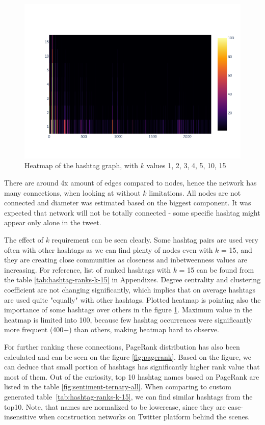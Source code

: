 \documentclass[conference]{IEEEtran}
\begin{document}
    \begin{figure}
        \includegraphics[scale=0.32]{figures/hashtag_heatmap_by_k}
        \caption{Heatmap of the hashtag graph, with $k$ values 1, 2, 3, 4, 5, 10, 15}
        \label{fig:hashtag-heatmap}
    \end{figure}

    There are around 4x amount of edges compared to nodes, hence the network has many connections, when looking at without $k$ limitations.
    All nodes are not connected and diameter was estimated based on the biggest component.
    It was expected that network will not be totally connected - some specific hashtag might appear only alone in the tweet.

    The effect of $k$ requirement can be seen clearly.
    Some hashtag pairs are used very often with other hashtags as we can find plenty of nodes even with $k$ = 15,
    and they are creating close communities as closeness and inbetweenness values are increasing.
    For reference, list of ranked hashtags with $k$ = 15 can be found from the table \ref{tab:hashtag-ranks-k-15} in Appendixes.
    Degree centrality and clustering coefficient are not changing significantly, which implies that on average hashtags are used quite "equally" with other hashtags.
    Plotted heatmap is pointing also the importance of some hashtags over others in the figure \ref{fig:hashtag-heatmap}.
    Maximum value in the heatmap is limited into 100, because few hashtag occurrences were significantly more frequent (400+) than others, making heatmap hard to observe.


    For further ranking these connections, PageRank distribution has also been calculated and can be seen on the figure \ref{fig:pagerank}.
    Based on the figure, we can deduce that small portion of hashtags has significantly higher rank value that most of them.
    Out of the curiosity, top 10 hashtag names based on PageRank are listed in the table \ref{fig:sentiment-ternary-all}.
    When comparing to custom generated table~\ref{tab:hashtag-ranks-k-15}, we can find similar hashtags from the top10.
    Note, that names are normalized to be lowercase, since they are case-insensitive when construction networks on Twitter platform behind the scenes.
\end{document}

